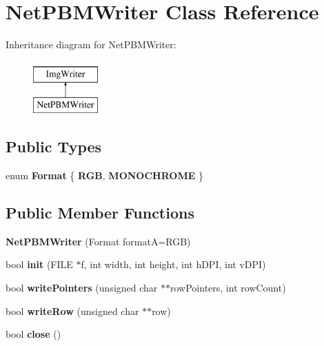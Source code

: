 \hypertarget{class_net_p_b_m_writer}{}\section{Net\+P\+B\+M\+Writer Class Reference}
\label{class_net_p_b_m_writer}
Inheritance diagram for Net\+P\+B\+M\+Writer\+:\begin{figure}[H]
\begin{center}
\leavevmode
\includegraphics[height=2.000000cm]{class_net_p_b_m_writer}
\end{center}
\end{figure}
\subsection*{Public Types}
\begin{DoxyCompactItemize}
\item 
\mbox{\label{class_net_p_b_m_writer_abdaa5c1142730bb029823777964aad2e}} 
enum {\bfseries Format} \{ {\bfseries R\+GB}, 
{\bfseries M\+O\+N\+O\+C\+H\+R\+O\+ME}
 \}
\end{DoxyCompactItemize}
\subsection*{Public Member Functions}
\begin{DoxyCompactItemize}
\item 
\mbox{\label{class_net_p_b_m_writer_a072df3a3f060bdc8932da8df1ab0aa32}} 
{\bfseries Net\+P\+B\+M\+Writer} (Format formatA=R\+GB)
\item 
\mbox{\label{class_net_p_b_m_writer_a7801c877aa0ae46a6d033693cd245c6c}} 
bool {\bfseries init} (F\+I\+LE $\ast$f, int width, int height, int h\+D\+PI, int v\+D\+PI)
\item 
\mbox{\label{class_net_p_b_m_writer_a846e55d724473274121ea28497f04c58}} 
bool {\bfseries write\+Pointers} (unsigned char $\ast$$\ast$row\+Pointers, int row\+Count)
\item 
\mbox{\label{class_net_p_b_m_writer_a5d042f24a42700a8e5a6a3ede9d8aa2b}} 
bool {\bfseries write\+Row} (unsigned char $\ast$$\ast$row)
\item 
\mbox{\label{class_net_p_b_m_writer_a235bf7d595a663141e3e022ea380726c}} 
bool {\bfseries close} ()
\end{DoxyCompactItemize}


